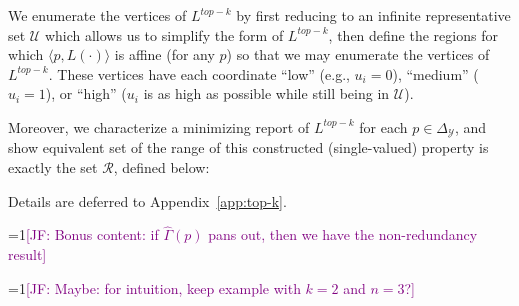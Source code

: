 \documentclass[12pt]{article}
\newcommand{\Comments}{1}
\newcommand{\mynote}[2]{\ifnum\Comments=1\textcolor{#1}{#2}\fi}
\newcommand{\jessie}[1]{\mynote{purple}{[JF: #1]}}
\newcommand{\simplex}{\Delta_\Y}
\newcommand{\R}{\mathcal{R}}
\newcommand{\U}{\mathcal{U}}
\newcommand{\Y}{\mathcal{Y}}
\newcommand{\inprod}[2]{\langle #1, #2 \rangle}%
\begin{document}
We enumerate the vertices of $L^{top-k}$ by first reducing to an infinite representative set $\U$ which allows us to simplify the form of $L^{top-k}$, then define the regions for which $\inprod{p}{L(\cdot)}$ is affine (for any $p$) so that we may enumerate the vertices of $L^{top-k}$.
These vertices have each coordinate ``low'' (e.g., $u_i = 0$), ``medium'' ($u_i = 1$), or ``high'' ($u_i$ is as high as possible while still being in $\U$).

Moreover, we characterize a minimizing report of $L^{top-k}$ for each $p \in \simplex$, and show equivalent set of the range of this constructed (single-valued) property is exactly the set $\R$, defined below:


Details are deferred to Appendix~\ref{app:top-k}.

\jessie{Bonus content: if $\hat \Gamma(p)$ pans out, then we have the non-redundancy result} 

\jessie{Maybe: for intuition, keep example with $k = 2$ and $n = 3$?}
\end{document}
